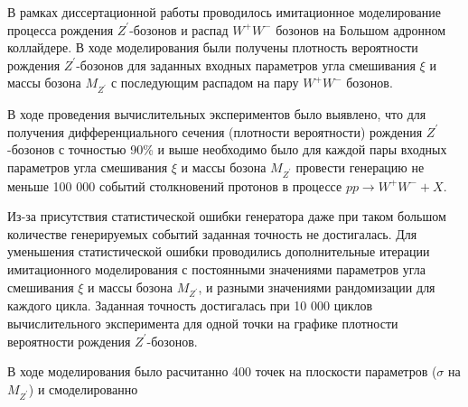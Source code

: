 В рамках диссертационной работы проводилось имитационное моделирование процесса рождения ${Z}^{\prime}$-бозонов и распад ${W}^{+}{W}^{-}$ бозонов на Большом адронном коллайдере. В ходе моделирования были получены плотность вероятности рождения ${Z}^{\prime}$-бозонов для заданных входных параметров угла смешивания $\xi$ и массы бозона ${M}_{{Z}^{\prime}}$ с последующим распадом на пару ${W}^{+}{W}^{-}$ бозонов.

В ходе проведения вычислительных экспериментов было выявлено, что для получения дифференциального сечения (плотности вероятности) рождения ${Z}^{\prime}$-бозонов с точностью 90\% и выше необходимо было для каждой пары входных параметров угла смешивания $\xi$ и массы бозона ${M}_{{Z}^{\prime}}$ провести генерацию не меньше 100 000 событий столкновений протонов в процессе $pp \rightarrow W^+W^- + X$. 

Из-за присутствия статистической ошибки генератора даже при таком большом количестве генерируемых событий заданная точность не достигалась. Для уменьшения статистической ошибки проводились дополнительные итерации имитационного моделирования с постоянными значениями параметров угла смешивания $\xi$ и массы бозона ${M}_{{Z}^{\prime}}$, и разными значениями рандомизации для каждого цикла. Заданная точность достигалась при 10 000 циклов вычислительного эксперимента для одной точки на графике плотности вероятности рождения ${Z}^{\prime}$-бозонов.

В ходе моделирования было расчитанно 400 точек на плоскости параметров ($\sigma$ на ${M}_{{Z}^{\prime}}$) и смоделированно 